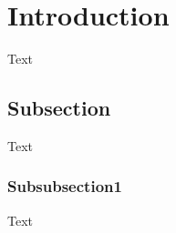 \section{Introduction}\label{sec:introduction}
Text

\subsection{Subsection}
Text
\subsubsection{Subsubsection1}
Text
